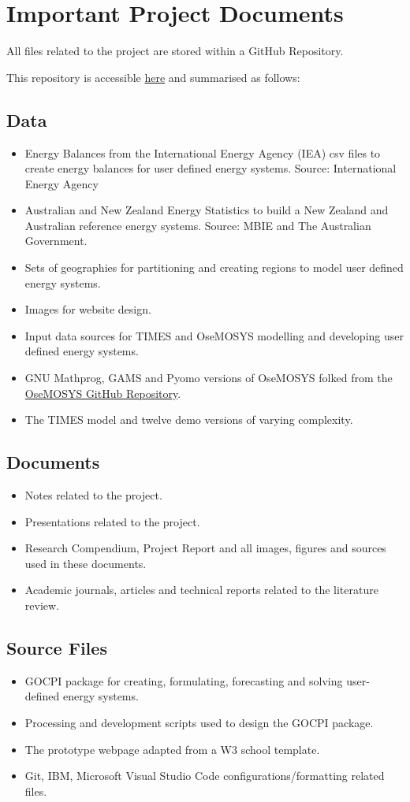 \documentclass[12pt]{article}
\begin{document}
\section{Important Project Documents}

All files related to the project are stored within a GitHub Repository.

This repository is accessible \href{https://github.com/CMCD1996/GOCPI}{here} and summarised as follows:
\subsection{Data}
\begin{itemize}
	\item Energy Balances from the International Energy Agency (IEA) csv files to create energy balances for user defined energy systems. Source: International Energy Agency
	\item Australian and New Zealand Energy Statistics to build a New Zealand and Australian reference energy systems. Source: MBIE and The Australian Government.
	\item Sets of geographies for partitioning and creating regions to model user defined energy systems.
	\item Images for website design.
	\item Input data sources for TIMES and OseMOSYS modelling and developing user defined energy systems.
	\item GNU Mathprog, GAMS and Pyomo versions of OseMOSYS folked from the \href{https://github.com/OSeMOSYS/OSeMOSYS}{OseMOSYS GitHub Repository}.
	\item The TIMES model and twelve demo versions of varying complexity.
\end{itemize}
\subsection{Documents}
\begin{itemize}
	\item Notes related to the project.
	\item Presentations related to the project.
	\item Research Compendium, Project Report and all images, figures and sources used in these documents.
	\item Academic journals, articles and technical reports related to the literature review.
\end{itemize}
\subsection{Source Files}
\begin{itemize}
	\item GOCPI package for creating, formulating, forecasting and solving user-defined energy systems.
	\item Processing and development scripts used to design the GOCPI package.
	\item The prototype webpage adapted from a W3 school template.
	\item Git, IBM, Microsoft Visual Studio Code configurations/formatting related files.
\end{itemize}
\end{document}
